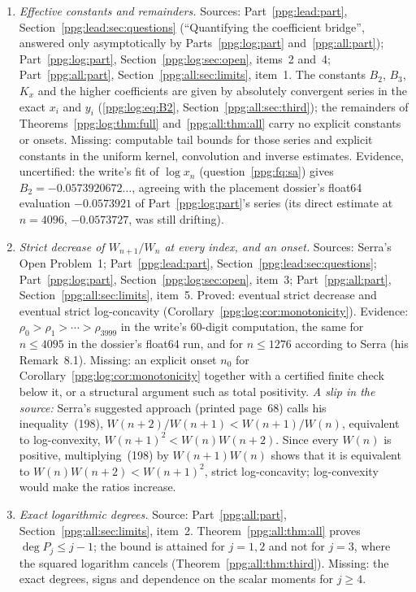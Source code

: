 \documentclass[11pt,letterpaper]{article}
\theoremstyle{remark}\newtheorem{remark}[theorem]{Remark}
\numberwithin{equation}{section}
\begin{document}
\begin{enumerate}[label=\arabic*.,ref=\arabic*]
\item\label{ppg:fq:effective} \emph{Effective constants and remainders.} Sources: Part~\ref{ppg:lead:part}, Section~\ref{ppg:lead:sec:questions} (``Quantifying the coefficient bridge'', answered only asymptotically by Parts~\ref{ppg:log:part} and~\ref{ppg:all:part}); Part~\ref{ppg:log:part}, Section~\ref{ppg:log:sec:open}, items~2 and~4; Part~\ref{ppg:all:part}, Section~\ref{ppg:all:sec:limits}, item~1. The constants $B_2$, $B_3$, $K_x$ and the higher coefficients are given by absolutely convergent series in the exact $x_i$ and $y_i$ (\eqref{ppg:log:eq:B2}, Section~\ref{ppg:all:sec:third}); the remainders of Theorems~\ref{ppg:log:thm:full} and~\ref{ppg:all:thm:all} carry no explicit constants or onsets. Missing: computable tail bounds for those series and explicit constants in the uniform kernel, convolution and inverse estimates. Evidence, uncertified: the write's fit of $\log x_n$ (question~\ref{ppg:fq:sa}) gives $B_2=-0.0573920672\ldots$, agreeing with the placement dossier's float64 evaluation $-0.0573921$ of Part~\ref{ppg:log:part}'s series (its direct estimate at $n=4096$, $-0.0573727$, was still drifting).
\item\label{ppg:fq:monotone} \emph{Strict decrease of $W_{n+1}/W_n$ at every index, and an onset.} Sources: Serra's Open Problem~1; Part~\ref{ppg:lead:part}, Section~\ref{ppg:lead:sec:questions}; Part~\ref{ppg:log:part}, Section~\ref{ppg:log:sec:open}, item~3; Part~\ref{ppg:all:part}, Section~\ref{ppg:all:sec:limits}, item~5. Proved: eventual strict decrease and eventual strict log-concavity (Corollary~\ref{ppg:log:cor:monotonicity}). Evidence: $\rho_0>\rho_1>\cdots>\rho_{3999}$ in the write's 60-digit computation, the same for $n\le4095$ in the dossier's float64 run, and for $n\le1276$ according to Serra (his Remark~8.1). Missing: an explicit onset $n_0$ for Corollary~\ref{ppg:log:cor:monotonicity} together with a certified finite check below it, or a structural argument such as total positivity. \emph{A slip in the source:} Serra's suggested approach (printed page~68) calls his inequality~(198), $W(n+2)/W(n+1)<W(n+1)/W(n)$, equivalent to log-convexity, $W(n+1)^2<W(n)W(n+2)$. Since every $W(n)$ is positive, multiplying~(198) by $W(n+1)W(n)$ shows that it is equivalent to $W(n)W(n+2)<W(n+1)^2$, strict log-concavity; log-convexity would make the ratios increase.
\item\label{ppg:fq:degrees} \emph{Exact logarithmic degrees.} Source: Part~\ref{ppg:all:part}, Section~\ref{ppg:all:sec:limits}, item~2. Theorem~\ref{ppg:all:thm:all} proves $\deg P_j\le j-1$; the bound is attained for $j=1,2$ and not for $j=3$, where the squared logarithm cancels (Theorem~\ref{ppg:all:thm:third}). Missing: the exact degrees, signs and dependence on the scalar moments for $j\ge4$.

\end{enumerate}
\end{document}
